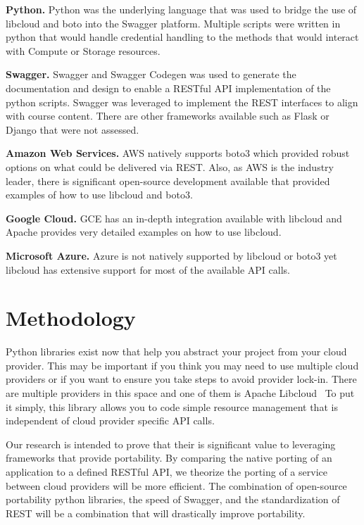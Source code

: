 \begin{description}

\item{\bf Python.} Python was the underlying language that was used to bridge
the use of libcloud and boto into the Swagger platform. Multiple scripts were
written in python that would handle credential handling to the methods that
would interact with Compute or Storage resources.
\item{\bf Swagger.} Swagger and Swagger Codegen was used to generate the
documentation and design to enable a RESTful API implementation of the python
scripts. Swagger was leveraged to implement the REST interfaces to
align with course content. There are other frameworks available such as Flask or
Django that were not assessed.
\item{\bf Amazon Web Services.} AWS natively supports boto3 which provided
robust options on what could be delivered via REST. Also, as AWS is the industry
leader, there is significant open-source development available that provided
examples of how to use libcloud and boto3.
\item{\bf Google Cloud.} GCE has an in-depth integration available with
libcloud and Apache provides very detailed examples on how to use libcloud.
\item{\bf Microsoft Azure.} Azure is not natively supported by libcloud or boto3
yet libcloud has extensive support for most of the available API calls.

\end{description}

\section{Methodology}

Python libraries exist now that help you abstract your project from  your cloud
provider. This may be important if you think you may need to use multiple cloud
providers or if you want to ensure you take steps to avoid provider lock-in.
There are multiple providers in this space and one of them is Apache
Libcloud~\cite{hid-sp18-518-LibCloud} To put it simply, this library allows you
to code simple resource  management that is independent of cloud provider
specific API calls.

Our research is intended to prove that their is significant value to leveraging
frameworks that provide portability. By comparing the native porting of an
application to a defined RESTful API, we theorize the porting of a service
between cloud providers will be more efficient. The combination of open-source
portability python libraries, the speed of Swagger, and the standardization of
REST will be a combination that will drastically improve portability.

